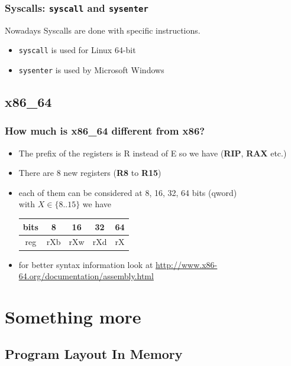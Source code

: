 \documentclass[]{beamer}
\newenvironment{changemargin}[2]{%
  \begin{list}{}{%
      \setlength{\topsep}{0pt}%
      \setlength{\leftmargin}{#1}%
      \setlength{\rightmargin}{#2}%
      \setlength{\listparindent}{\parindent}%
      \setlength{\itemindent}{\parindent}%
      \setlength{\parsep}{\parskip}%
    }%
  \item[]}{\end{list}}
\begin{document}
\begin{frame}
  \frametitle{Syscalls: {\tt syscall} and {\tt sysenter}}
  Nowadays Syscalls are done with specific instructions.
  \begin{itemize}
  \item{{\tt syscall} is used for Linux 64-bit}
  \item{{\tt sysenter} is used by Microsoft Windows}
  \end{itemize}
\end{frame}

\subsection{x86\_64}
\begin{frame}
  \frametitle{How much is x86\_64 different from x86?}
  \begin{changemargin}{-0.7cm}{0cm}
    \begin{itemize}
    \item{The prefix of  the registers is R instead of E so we have ({\bf RIP}, {\bf RAX} etc.)}
    \item{There are 8 new registers ({\bf R8} to {\bf R15})}
    \item{each of them can be considered at 8, 16, 32, 64 bits (qword)\\
        with $X \in \{8..15\}$ we have }
      \begin{table}[h]
        \begin{tabular}{|c!{\vrule width 1pt }c|c|c|c|}
          \hline
          bits&8&16&32&64\\
          \hline
          reg&rXb&rXw&rXd&rX\\
          \hline
        \end{tabular}
      \end{table}
    \item{for better syntax information look at \url{http://www.x86-64.org/documentation/assembly.html}}
    \end{itemize}
  \end{changemargin}
\end{frame}
\section{Something more}

\subsection{Program Layout In Memory}
\end{document}
